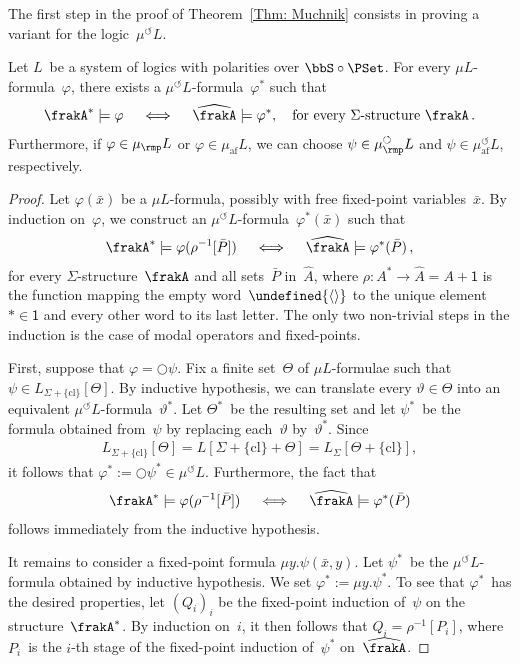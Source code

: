 \documentclass[10pt, fleqn]{scrartcl}
\makeatletter
\newcommand\m@thsm@ller[2]{\mbox{\relscale{0.91}$\m@th#1#2$}}
\let\smaller\undefined
\DeclareRobustCommand\smaller[1]{\relax\ifmmode{\mathpalette\m@thsm@ller{#1}}\else{\relscale{0.91}#1}\fi}
\newcommand*{\cl}{\mathrm{cl}}
\newcommand*{\muaf}{\mu_{\mathrm{af}}}
\newcommand*{\mup}{\mu_\rmp}
\newcommand*{\one}{\textsf{1}}
\newcommand*{\emptyseq}{\smaller{\langle\rangle}}
\newcommand*{\?}{\kern .08em}
\newcommand\medcircle{\bigcirc}
\newcommand\rcirclearrowleft{\circlearrowleft}
\makeatother
\begin{document}
The first step in the proof of Theorem~\ref{Thm: Muchnik} consists in proving
a variant for the logic~$\mu^\rcirclearrowleft L$.
\begin{Lem}\label{Lem: from A* to hat A}
Let $L$~be a system of logics with polarities over $\bbS \circ \PSet$.
For every $\mu L$-formula~$\varphi$, there exists a $\mu^\rcirclearrowleft L$-formula~$\varphi^*$
such that
\begin{align*}
  \frakA^* \models \varphi \quad\iff\quad \widehat\frakA \models \varphi^*,
  \quad\text{for every $\Sigma$-structure } \frakA\,.
\end{align*}
Furthermore, if $\varphi \in \mup L$ or $\varphi \in \muaf L$,
we can choose $\psi \in \mup^\rcirclearrowleft L$ and $\psi \in \muaf^\rcirclearrowleft L$,
respectively.
\end{Lem}
\begin{proof}
Let $\varphi(\bar x)$ be a $\mu L$-formula, possibly with free fixed-point variables~$\bar x$.
By induction on~$\varphi$, we construct an $\mu^\rcirclearrowleft L$-formula~$\varphi^*(\bar x)$
such that
\begin{align*}
  \frakA^* \models \varphi(\rho^{-1}[\bar P])
  \quad\iff\quad
  \widehat\frakA \models \varphi^*(\bar P)\,,
\end{align*}
for every $\Sigma$-structure~$\frakA$ and all sets~$\bar P$ in~$\widehat A$,
where $\rho : A^* \to \widehat A = A + \one$ is the function mapping the empty word~$\emptyseq$
to the unique element ${*} \in \one$ and every other word to its last letter.
The only two non-trivial steps in the induction is the case of modal operators and fixed-points.

First, suppose that $\varphi = {\medcircle}\psi$.
Fix a finite set~$\Theta$ of $\mu L$-formulae such that
$\psi \in  L_{\Sigma + \{\cl\}}[\Theta]$.
By inductive hypothesis, we can translate every $\vartheta \in \Theta$ into an equivalent
$\mu^\rcirclearrowleft L$-formula~$\vartheta^*$.
Let $\Theta^*$~be the resulting set and let $\psi^*$~be the formula obtained from~$\psi$
by replacing each~$\vartheta$ by~$\vartheta^*$.
Since
\begin{align*}
  L_{\Sigma + \{\cl\}}[\Theta] = L[\Sigma + \{\cl\} + \Theta] = L_\Sigma[\Theta + \{\cl\}],
\end{align*}
it follows that $\varphi^* := {\medcircle}\psi^* \in \mu^\rcirclearrowleft L$.
Furthermore, the fact that
\begin{align*}
  \frakA^* \models \varphi(\rho^{-1}[\bar P])
  \quad\iff\quad
  \widehat\frakA \models \varphi^*(\bar P)
\end{align*}
follows immediately from the inductive hypothesis.

It remains to consider a fixed-point formula $\mu y.\psi(\bar x,y)$.
Let $\psi^*$~be the $\mu^\rcirclearrowleft L$-formula obtained by inductive hypothesis.
We set $\varphi^* := \mu y.\psi^*$. To see that $\varphi^*$~has the desired properties,
let $(Q_i)_i$ be the fixed-point induction of~$\psi$ on the structure~$\frakA^*$.
By induction on~$i$, it then follows that $Q_i = \rho^{-1}[P_i]$, where $P_i$~is the $i$-th
stage of the fixed-point induction of~$\psi^*$ on~$\widehat\frakA$.
\end{proof}
\end{document}
